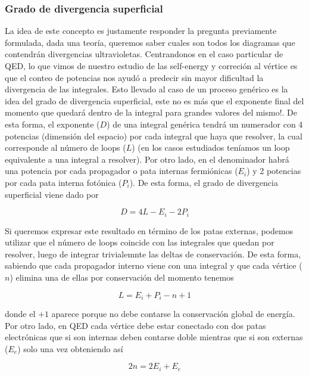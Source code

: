 \documentclass{article}
\numberwithin{equation}{section}
\begin{document}
\subsubsection{Grado de divergencia superficial}

La idea de este concepto es justamente responder la pregunta previamente formulada, dada una teoría, queremos saber cuales son todos los diagramas que contendrán divergencias ultravioletas. Centrandonos en el caso particular de QED, lo que vimos de nuestro estudio de las self-energy y correción al vértice es que el conteo de potencias nos ayudó a predecir sin mayor dificultad la divergencia de las integrales. Esto llevado al caso de un proceso genérico es la idea del grado de divergencia superficial, este no es más que el exponente final del momento que quedará dentro de la integral para grandes valores del mismo!. De esta forma, el exponente ($ D $) de una integral genérica tendrá un numerador con 4 potencias (dimensión del espacio) por cada integral que haya que resolver, la cual corresponde al número de loops ($ L $) (en los casos estudiados teníamos un loop equivalente a una integral a resolver). Por otro lado, en el denominador habrá una potencia por cada propagador o pata internas fermiónicas ($ E_i $) y 2 potencias por cada pata interna fotónica ($ P_i $). De esta forma, el grado de divergencia superficial viene dado por

\begin{equation}\label{key}
D=4L-E_i-2P_i
\end{equation}

Si queremos expresar este resultado en término de los patas externas, podemos utilizar que el número de loops coincide con las integrales que quedan por resolver, luego de integrar trivialemnte las deltas de conservación. De esta forma, sabiendo que cada propagador interno viene con una integral y que cada vértice ($ n $) elimina una de ellas por conservación del momento tenemos 

\begin{equation}\label{key}
L=E_i+P_i-n+1
\end{equation}

donde el $ +1 $ aparece porque no debe contarse la conservación global de energía. Por otro lado, en QED cada vértice debe estar conectado con dos patas electrónicas que si son internas deben contarse doble mientras que si son externas ($ E_e $) solo una vez obteniendo así

\begin{equation}\label{key}
2n=2E_i + E_e
\end{equation}
\end{document}
